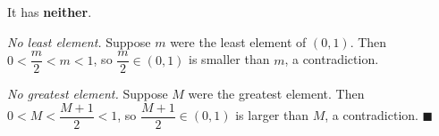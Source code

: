 It has \textbf{neither}.

\emph{No least element.} Suppose $m$ were the least element of $(0,1)$. Then $0<\dfrac m2<m<1$, so $\dfrac m2\in(0,1)$ is smaller than $m$, a contradiction.

\emph{No greatest element.} Suppose $M$ were the greatest element. Then $0<M<\dfrac{M+1}{2}<1$, so $\dfrac{M+1}{2}\in(0,1)$ is larger than $M$, a contradiction. $\blacksquare$

